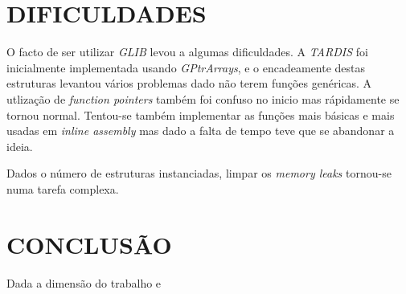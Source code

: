 \documentclass[letterpaper, 10 pt, conference]{IEEEtran}  %
\begin{document}
\section{DIFICULDADES}

O facto de ser utilizar \textit{GLIB} levou a algumas dificuldades. A \textit{TARDIS} foi inicialmente implementada usando \textit{GPtrArrays}, e o encadeamente destas estruturas levantou vários problemas dado não terem funções genéricas.
A utlização de \textit{function pointers} também foi confuso no inicio mas rápidamente se tornou normal. Tentou-se também implementar as funções mais básicas e mais usadas em \textit{inline assembly} mas dado a falta de tempo teve que se abandonar a ideia.

Dados o número de estruturas instanciadas, limpar os \textit{memory leaks} tornou-se numa tarefa complexa.

\section{CONCLUSÃO}


Dada a dimensão do trabalho e



\addtolength{\textheight}{-12cm}   %









\end{document}
